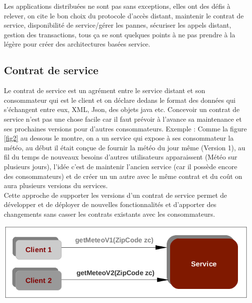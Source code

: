 \documentclass[12pt, a4paper, openany]{report}
\begin{document}
 Les applications distribuées ne sont pas sans exceptions, elles ont des défis à relever, on cite le bon choix du protocole d’accès distant, maintenir le contrat de service, disponibilité de service/gérer les pannes, sécuriser les appels distant, gestion des transactions, tous ça se sont quelques points à ne pas prendre à la légère pour créer des architectures basées service.\\
 
  \subsection{Contrat de service}
  Le contrat de service est un agrément entre le service distant et son consommateur qui est le client et on déclare dedans le format des données qui s’échangent entre eux, XML, Json, des objets java etc. Concevoir un contrat de service n’est pas une chose facile car il faut prévoir à l’avance sa maintenance et ses prochaines versions pour d’autres consommateurs. Exemple : Comme la figure \ref{fig2} au dessous le montre, on a un service qui expose à ses consommateur la météo, au début il était conçue de fournir la météo du jour même (Version 1), au fil du temps de nouveaux besoins d’autres utilisateurs apparaissent (Météo sur plusieurs jours), l’idée c’est de maintenir l’ancien service (car il possède encore des consommateurs) et de créer un un autre avec le même contrat et du coût on aura plusieurs versions du services.\\
  
  Cette approche de supporter les versions d’un contrat de service permet de développer et de déployer de nouvelles fonctionnalités et d’apporter des changements sans casser les contrats existants avec les consommateurs.\\
  
   \begin{center}
     \includegraphics[scale=0.52]{version_contrat_2.png}
     \label{fig2}
   \end{center}  
  
\end{document}
